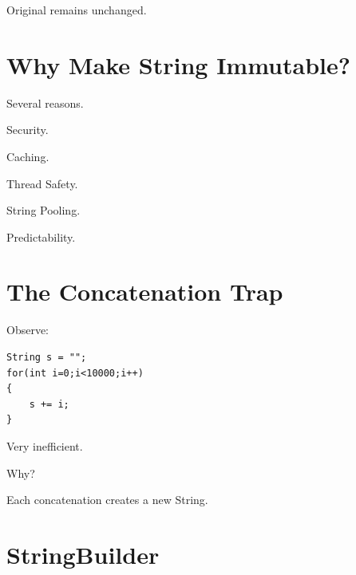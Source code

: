 \documentclass[11pt,a4paper]{book}
\begin{document}

Original remains unchanged.


\section{Why Make String Immutable?}

Several reasons.


Security.


Caching.


Thread Safety.


String Pooling.


Predictability.


\section{The Concatenation Trap}

Observe:

\begin{verbatim}
String s = "";
for(int i=0;i<10000;i++)
{
    s += i;
}
\end{verbatim}


Very inefficient.


Why?

Each concatenation creates
a new String.


\section{StringBuilder}
\end{document}

